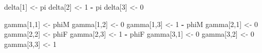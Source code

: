 \documentclass[
  12pt,
]{krantz}
\newenvironment{Shaded}{\begin{snugshade}}{\end{snugshade}}
\newcommand{\DecValTok}[1]{\textcolor[rgb]{0.00,0.00,0.81}{#1}}
\newcommand{\NormalTok}[1]{#1}
\newcommand{\OtherTok}[1]{\textcolor[rgb]{0.56,0.35,0.01}{#1}}
\newcommand{\SpecialCharTok}[1]{\textcolor[rgb]{0.81,0.36,0.00}{\textbf{#1}}}
\begin{document}
\begin{Shaded}
\begin{Highlighting}[]
\NormalTok{  delta[}\DecValTok{1}\NormalTok{] }\OtherTok{\textless{}{-}}\NormalTok{ pi}
\NormalTok{  delta[}\DecValTok{2}\NormalTok{] }\OtherTok{\textless{}{-}} \DecValTok{1} \SpecialCharTok{{-}}\NormalTok{ pi}
\NormalTok{  delta[}\DecValTok{3}\NormalTok{] }\OtherTok{\textless{}{-}} \DecValTok{0}
  
\NormalTok{  gamma[}\DecValTok{1}\NormalTok{,}\DecValTok{1}\NormalTok{] }\OtherTok{\textless{}{-}}\NormalTok{ phiM            }
\NormalTok{  gamma[}\DecValTok{1}\NormalTok{,}\DecValTok{2}\NormalTok{] }\OtherTok{\textless{}{-}} \DecValTok{0}               
\NormalTok{  gamma[}\DecValTok{1}\NormalTok{,}\DecValTok{3}\NormalTok{] }\OtherTok{\textless{}{-}} \DecValTok{1} \SpecialCharTok{{-}}\NormalTok{ phiM        }
\NormalTok{  gamma[}\DecValTok{2}\NormalTok{,}\DecValTok{1}\NormalTok{] }\OtherTok{\textless{}{-}} \DecValTok{0}               
\NormalTok{  gamma[}\DecValTok{2}\NormalTok{,}\DecValTok{2}\NormalTok{] }\OtherTok{\textless{}{-}}\NormalTok{ phiF            }
\NormalTok{  gamma[}\DecValTok{2}\NormalTok{,}\DecValTok{3}\NormalTok{] }\OtherTok{\textless{}{-}} \DecValTok{1} \SpecialCharTok{{-}}\NormalTok{ phiF        }
\NormalTok{  gamma[}\DecValTok{3}\NormalTok{,}\DecValTok{1}\NormalTok{] }\OtherTok{\textless{}{-}} \DecValTok{0}               
\NormalTok{  gamma[}\DecValTok{3}\NormalTok{,}\DecValTok{2}\NormalTok{] }\OtherTok{\textless{}{-}} \DecValTok{0}               
\NormalTok{  gamma[}\DecValTok{3}\NormalTok{,}\DecValTok{3}\NormalTok{] }\OtherTok{\textless{}{-}} \DecValTok{1}               
\end{Highlighting}
\end{Shaded}
\end{document}
